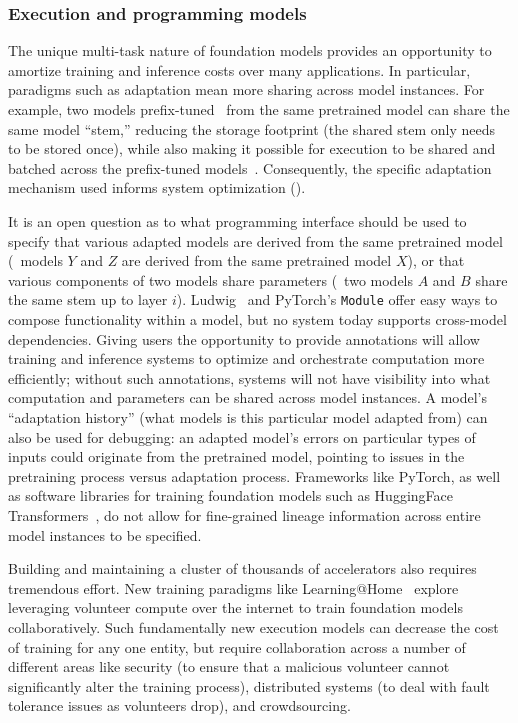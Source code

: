 \subsubsection{Execution and programming models}

The unique multi-task nature of foundation models provides an opportunity to amortize training and inference costs over many applications. In particular, paradigms such as adaptation mean more sharing across model instances. For example, two models prefix-tuned~\citep{li2021prefix} from the same pretrained model can share the same model ``stem,'' reducing the storage footprint (the shared stem only needs to be stored once), while also making it possible for execution to be shared and batched across the prefix-tuned models~\cite{shen2019nexus, narayanan2018accelerating}. Consequently, the specific adaptation mechanism used informs system optimization ().

It is an open question as to what programming interface should be used to specify that various adapted models are derived from the same pretrained model (\eg~models $Y$ and $Z$ are derived from the same pretrained model $X$), or that various components of two models share parameters (\eg~two models $A$ and $B$ share the same stem up to layer $i$). Ludwig~\cite{molino2019ludwig} and PyTorch's \texttt{Module} offer easy ways to compose functionality within a model, but no system today supports cross-model dependencies. Giving users the opportunity to provide annotations will allow training and inference systems to optimize and orchestrate computation more efficiently; without such annotations, systems will not have visibility into what computation and parameters can be shared across model instances. A model's ``adaptation history'' (what models is this particular model adapted from) can also be used for debugging: an adapted model's errors on particular types of inputs could originate from the pretrained model, pointing to issues in the pretraining process versus adaptation process. Frameworks like PyTorch, as well as software libraries for training foundation models such as HuggingFace Transformers~\citep{wolf2020transformers}, do not allow for fine-grained lineage information across entire model instances to be specified.

Building and maintaining a cluster of thousands of accelerators also requires tremendous effort. New training paradigms like Learning@Home~\citep{Ryabinin2020Learninghome, Diskin2021collab} explore leveraging volunteer compute over the internet to train foundation models collaboratively. Such fundamentally new execution models can decrease the cost of training for any one entity, but require collaboration across a number of different areas like security (to ensure that a malicious volunteer cannot significantly alter the training process), distributed systems (to deal with fault tolerance issues as volunteers drop), and crowdsourcing.


